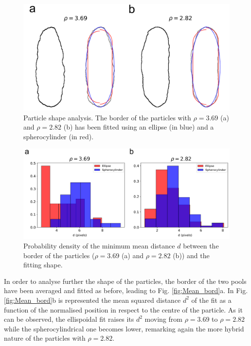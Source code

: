 \documentclass{article}
\begin{document}
\begin{figure}
    \centering
    \includegraphics[width=1\columnwidth]{Part fit.png}
    \caption{Particle shape analysis. The border of the particles with $\rho = 3.69$ (a) and $\rho = 2.82$ (b) has been fitted using an ellipse (in blue) and a spherocylinder (in red).}
    \label{fig:Part_fit}
\end{figure}


\begin{figure}
    \centering
    \includegraphics[width=1\columnwidth]{Mean_dist.png}
    \caption{Probability density of the minimum mean distance $d$ between the border of the particles ($\rho = 3.69$ (a) and $\rho = 2.82$ (b)) and the fitting shape.}
    \label{fig:Mean_dist}
\end{figure}

In order to analyse further the shape of the particles, the border of the two pools have been averaged and fitted as before, leading to Fig. \ref{fig:Mean_bord}a. In Fig. \ref{fig:Mean_bord}b is represented the mean squared distance $d^2$ of the fit as a function of the normalised position in respect to the centre of the particle. As it can be observed, the ellispoidal fit raises its $d^2$ moving from $\rho=3.69$ to $\rho=2.82$ while the spherocylindrical one becomes lower, remarking again the more hybrid nature of the particles with $\rho=2.82$.
\end{document}
